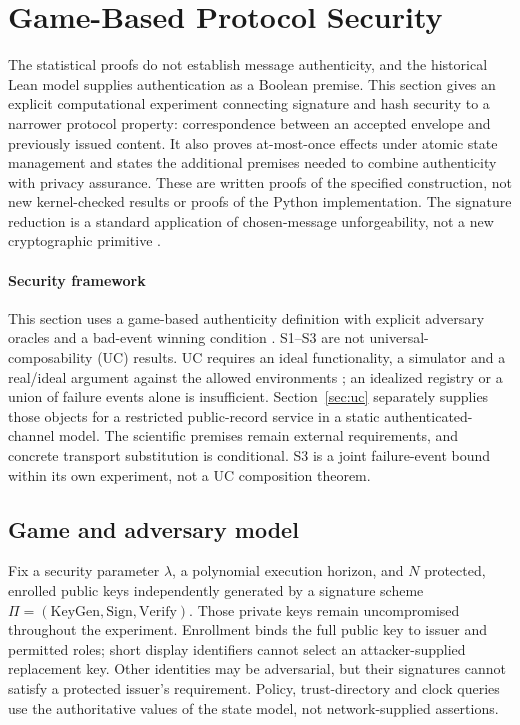 \section{Game-Based Protocol Security}
\label{sec:security}
The statistical proofs do not establish message authenticity, and the
historical Lean model supplies authentication as a Boolean premise. This
section gives an explicit computational experiment connecting signature and
hash security to a narrower protocol property: correspondence between an
accepted envelope and previously issued content. It also proves at-most-once
effects under atomic state management and states the additional premises
needed to combine authenticity with privacy assurance. These are written
proofs of the specified construction, not new kernel-checked results or
proofs of the Python implementation. The signature reduction is a standard
application of chosen-message unforgeability, not a new cryptographic primitive
\citep{goldwasser1988signatures}.

\paragraph{Security framework}
This section uses a game-based authenticity definition with explicit
adversary oracles and a bad-event winning condition \citep{bellare2006games}.
S1--S3 are not universal-composability (UC) results. UC requires an ideal
functionality, a simulator and a real/ideal argument against the allowed
environments \citep{canetti2001uc,canetti2025uc}; an idealized registry or
a union of failure events alone is insufficient.
Section~\ref{sec:uc} separately supplies those objects for a restricted
public-record service in a static authenticated-channel model.
The scientific premises remain external requirements, and concrete
transport substitution is conditional. S3 is a joint failure-event
bound within its own experiment, not a UC composition theorem.

\subsection{Game and adversary model}
\label{sec:security-game}
Fix a security parameter $\lambda$, a polynomial execution horizon, and $N$
protected, enrolled public keys independently generated by a signature
scheme $\Pi=(\mathrm{KeyGen},\mathrm{Sign},\mathrm{Verify})$. Those private
keys remain uncompromised throughout the experiment. Enrollment binds the
full public key to issuer and permitted roles; short display identifiers
cannot select an attacker-supplied replacement key. Other identities may be
adversarial, but their signatures cannot satisfy a protected issuer's
requirement. Policy, trust-directory and clock queries use the authoritative
values of the state model, not network-supplied assertions.

